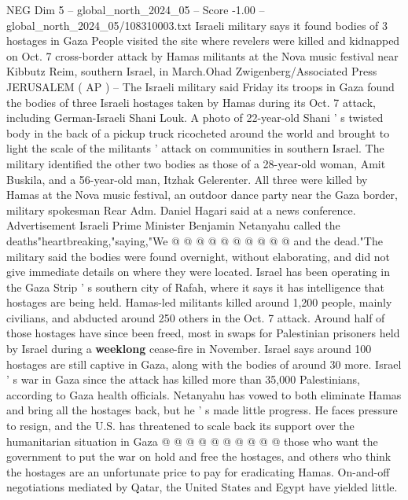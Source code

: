 \begin{textsample}{NEG Dim 5 – global\_north\_2024\_05 – Score -1.00 – global\_north\_2024\_05/108310003.txt}  \label{ex:f5_neg_284}
Israeli military says it found bodies of 3 hostages in Gaza People visited the site where revelers were killed and kidnapped on Oct. 7 cross-border attack by Hamas militants at the Nova music festival near Kibbutz Reim, southern Israel, in March.Ohad Zwigenberg/Associated Press JERUSALEM ( AP ) -- The Israeli military said Friday its troops in Gaza found the bodies of three Israeli hostages taken by Hamas during its Oct. 7 attack, including German-Israeli Shani Louk.
A photo of 22-year-old Shani ' s twisted body in the back of a pickup truck ricocheted around the world and brought to light the scale of the militants ' attack on communities in southern Israel.
The military identified the other two bodies as those of a 28-year-old woman, Amit Buskila, and a 56-year-old man, Itzhak Gelerenter.
All three were killed by Hamas at the Nova music festival, an outdoor dance party near the Gaza border, military spokesman Rear Adm.
Daniel Hagari said at a news conference.
Advertisement Israeli Prime Minister Benjamin Netanyahu called the deaths"heartbreaking,"saying,"We @ @ @ @ @ @ @ @ @ @ and the dead."The military said the bodies were found overnight, without elaborating, and did not give immediate details on where they were located.
Israel has been operating in the Gaza Strip ' s southern city of Rafah, where it says it has intelligence that hostages are being held.
Hamas-led militants killed around 1,200 people, mainly civilians, and abducted around 250 others in the Oct. 7 attack.
Around half of those hostages have since been freed, most in swaps for Palestinian prisoners held by Israel during a \textbf{weeklong} cease-fire in November.
Israel says around 100 hostages are still captive in Gaza, along with the bodies of around 30 more.
Israel ' s war in Gaza since the attack has killed more than 35,000 Palestinians, according to Gaza health officials.
Netanyahu has vowed to both eliminate Hamas and bring all the hostages back, but he ' s made little progress.
He faces pressure to resign, and the U.S. has threatened to scale back its support over the humanitarian situation in Gaza @ @ @ @ @ @ @ @ @ @ those who want the government to put the war on hold and free the hostages, and others who think the hostages are an unfortunate price to pay for eradicating Hamas.
On-and-off negotiations mediated by Qatar, the United States and Egypt have yielded little.

\end{textsample}
